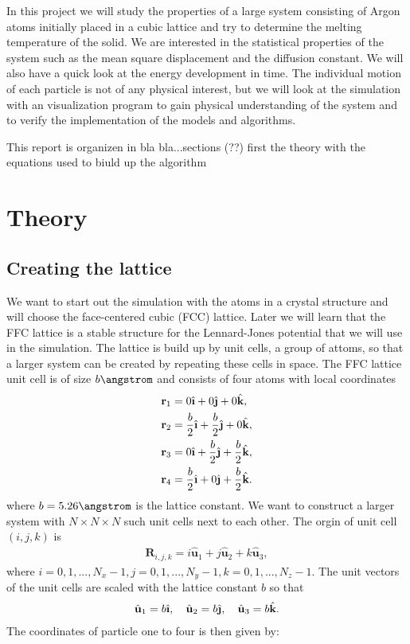 \documentclass[11pt,a4wide]{article}
\renewcommand{\vec}{\mathbf}
\newcommand{\ihat}{\hat{\textbf{\i}}}
\newcommand{\jhat}{\hat{\textbf{\j}}}
\newcommand{\khat}{\hat{\textbf{k}}}
\begin{document}
In this project we will study the properties of a large system consisting of Argon atoms initially placed in a cubic lattice and try to determine the melting temperature of the solid. We are interested in the statistical properties of the system such as the mean square displacement and the diffusion constant. We will also have a quick look at the energy development in time. The individual motion of each particle is not of any physical interest, but we will look at the simulation with an visualization program to gain physical understanding of the system and to verify the implementation of the models and algorithms. 

This report is organizen in bla bla...sections (??)
first the theory with the equations used to biuld up the algorithm

\newpage
\section{Theory}

\subsection{Creating the lattice} \label{sec: creating_lattice_theory} 
We want to start out the simulation with the atoms in a crystal structure and will choose the face-centered cubic (FCC) lattice. Later we will learn that the FFC lattice is a stable structure for the Lennard-Jones potential that we will use in the simulation. The lattice is build up by unit cells, a group of attoms, so that a larger system can be created by repeating these cells in space. The FFC lattice unit cell is of size $b \angstrom $ and consists of four atoms with local coordinates
\begin{align}
	\vec r_1 &= 0 \ihat + 0 \jhat + 0 \khat,\\
	\vec r_2 &= \frac{b}{2} \ihat + \frac{b}{2} \jhat + 0 \khat,\\
	\vec r_3 &= 0 \ihat + \frac{b}{2} \jhat + \frac{b}{2} \khat,\\
	\vec r_4 &= \frac{b}{2} \ihat + 0 \jhat + \frac{b}{2} \khat.
\end{align}
where $b=5.26 \angstrom$ is the lattice constant. We want to construct a larger system with $N\times N\times N$ such unit cells next to each other. The orgin of unit cell $(i,j,k)$ is
\begin{align}
	\vec R_{i,j,k} = i \hat{\textbf{u}}_1 + j \hat{\textbf{u}}_2 + k \hat{\textbf{u}}_3,
\end{align}
where $i=0,1,..., N_x-1, j=0,1,..., N_y-1, k=0,1,..., N_z-1$. The unit vectors of the unit cells are scaled with the lattice constant $b$ so that
\begin{align}
	\hat{\textbf{u}}_1 = b\ihat, \quad \hat{\textbf{u}}_2 = b\jhat, \quad \hat{\textbf{u}}_3 = b\khat.
\end{align}
The coordinates of particle one to four is then given by:
\end{document}
